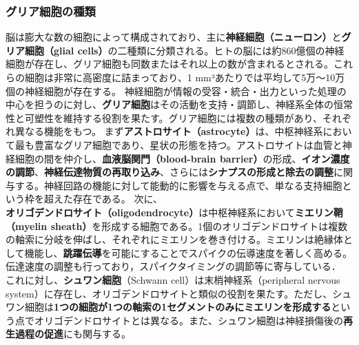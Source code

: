 \subsubsection{グリア細胞の種類}
脳は膨大な数の細胞によって構成されており、主に\textbf{神経細胞（ニューロン）}と\textbf{グリア細胞（glial cells）}の二種類に分類される。ヒトの脳には約860億個の神経細胞が存在し、グリア細胞も同数またはそれ以上の数が含まれるとされる。これらの細胞は非常に高密度に詰まっており、1 mm³あたりでは平均して5万〜10万個の神経細胞が存在する。
神経細胞が情報の受容・統合・出力といった処理の中心を担うのに対し、\textbf{グリア細胞}はその活動を支持・調節し、神経系全体の恒常性と可塑性を維持する役割を果たす。グリア細胞には複数の種類があり、それぞれ異なる機能をもつ。
まず\textbf{アストロサイト（astrocyte）}は、中枢神経系において最も豊富なグリア細胞であり、星状の形態を持つ。アストロサイトは血管と神経細胞の間を仲介し、\textbf{血液脳関門（blood-brain barrier）}の形成、\textbf{イオン濃度の調節}、\textbf{神経伝達物質の再取り込み}、さらには\textbf{シナプスの形成と除去の調整}に関与する。神経回路の機能に対して能動的に影響を与える点で、単なる支持細胞という枠を超えた存在である。
次に、\textbf{オリゴデンドロサイト（oligodendrocyte）}は中枢神経系において\textbf{ミエリン鞘（myelin sheath）}を形成する細胞である。1個のオリゴデンドロサイトは複数の軸索に分岐を伸ばし、それぞれにミエリンを巻き付ける。ミエリンは絶縁体として機能し、\textbf{跳躍伝導}を可能にすることでスパイクの伝導速度を著しく高める。
伝達速度の調整も行っており，スパイクタイミングの調節等に寄与している．
これに対し、\textbf{シュワン細胞}（Schwann cell）は末梢神経系（peripheral nervous system）に存在し、オリゴデンドロサイトと類似の役割を果たす。ただし、シュワン細胞は\textbf{1つの細胞が1つの軸索の1セグメントのみにミエリンを形成する}という点でオリゴデンドロサイトとは異なる。また、シュワン細胞は神経損傷後の\textbf{再生過程の促進}にも関与する。
